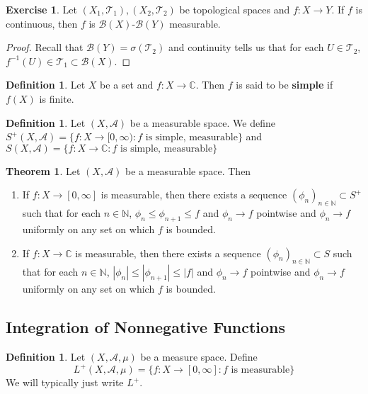 \documentclass[12pt]{amsart}
\theoremstyle{definition}
\newtheorem{defn}[definition]{Definition}
\newtheorem{thm}[definition]{Theorem}
\newtheorem{ex}[definition]{Exercise}
\newcommand{\sig}{\sigma}
\newcommand{\C}{\mathbb{C}}
\newcommand{\N}{\mathbb{N}}
\newcommand{\MA}{\mathcal{A}}
\newcommand{\MB}{\mathcal{B}}
\newcommand{\MT}{\mathcal{T}}
\newcommand{\RG}{[0,\infty]}
\newcommand{\Rg}{[0,\infty)}
\begin{document}
	\begin{ex}
		Let $(X_1,\MT_1), (X_2,\MT_2)$ be topological spaces and $f: X \rightarrow Y$. If $f$ is continuous, then $f$ is $\MB(X)$-$\MB(Y)$ measurable.
	\end{ex}
	
	\begin{proof}
		Recall that $\MB(Y) = \sig(\MT_2)$ and continuity tells us that for each $U \in \MT_2$, $f^{-1}(U) \in \MT_1 \subset \MB(X)$. 
	\end{proof}
	
	\begin{defn}
		Let $X$ be a set and $f:X \rightarrow \C$. Then $f$ is said to be \textbf{simple} if $f(X)$ is finite.
	\end{defn}
	
	\begin{defn}
		Let $(X,\MA)$ be a measurable space. We define $S^+(X,\MA) = \{f:X \rightarrow \Rg: f \text{ is simple, measurable}\}$ and $S(X,\MA) = \{f: X \rightarrow \C: f \text{ is simple, measurable}\}$
	\end{defn}
	
	\begin{thm}
		Let $(X, \MA)$ be a measurable space. Then 
		\begin{enumerate}
			\item If $f: X \rightarrow \RG$ is measurable, then there exists a sequence $(\phi_n)_{n \in \N} \subset S^+$ such that for each $n \in \N$, $\phi_n \leq \phi_{n+1} \leq f$ and $\phi_n \rightarrow f$ pointwise and $\phi_n \rightarrow f$ uniformly on any set on which $f$ is bounded.
			
			\item If $f: X \rightarrow \C$ is measurable, then there exists a sequence $(\phi_n)_{n \in \N} \subset S$ such that for each $n \in \N$, $|\phi_n| \leq |\phi_{n+1}| \leq |f|$ and $\phi_n \rightarrow f$ pointwise and $\phi_n \rightarrow f$ uniformly on any set on which $f$ is bounded.
		\end{enumerate}
	\end{thm}
	
	\newpage
	
	\subsection{Integration of Nonnegative Functions}
	
	\begin{defn}
		Let $(X, \MA, \mu)$ be a measure space. Define $$L^{+}(X, \MA, \mu) = \{f:X \rightarrow \RG : f \text{ is measurable}\}$$ We will typically just write $L^{+}$.
	\end{defn}
	
\end{document}
